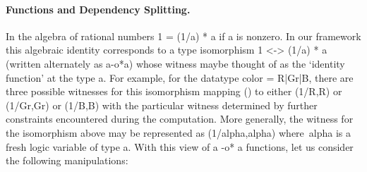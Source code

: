 \documentclass[preprint]{sigplanconf}
\begin{document}
\paragraph*{Functions and Dependency Splitting.} 


In the algebra of rational numbers {{1 = (1/a) * a}} if {{a}} is
nonzero.  In our framework this algebraic identity corresponds to a
type isomorphism {{1 <-> (1/a) * a}} (written alternately as
{{a-o*a}}) whose witness maybe thought of as the `identity function'
at the type {{a}}.  For example, for the datatype {{color = R|Gr|B}},
there are three possible witnesses for this isomorphism mapping {{()}}
to either {{(1/R,R)}} or {{(1/Gr,Gr)}} or {{(1/B,B)}} with the
particular witness determined by further constraints encountered
during the computation. More generally, the witness for the
isomorphism above may be represented as {{(1/alpha,alpha)}}
where~{{alpha}} is a fresh logic variable of type {{a}}. With this
view of {{a -o* a}} functions, let us consider the following
manipulations:

\end{document}
